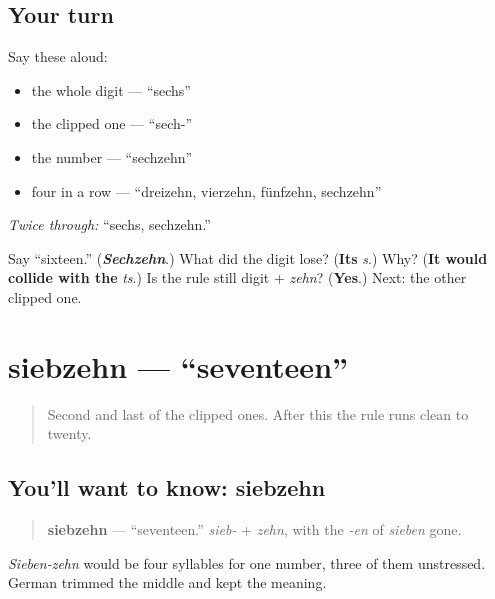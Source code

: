 \subsection*{Your turn}
Say these aloud:

\begin{itemize}
\raggedright
  \item the whole digit — \textquotedblleft{}sechs\textquotedblright{}
  \item the clipped one — \textquotedblleft{}sech-\textquotedblright{}
  \item the number — \textquotedblleft{}sechzehn\textquotedblright{}
  \item four in a row — \textquotedblleft{}dreizehn, vierzehn, fünfzehn, sechzehn\textquotedblright{}
\end{itemize}

\emph{Twice through:} \textquotedblleft{}sechs, sechzehn.\textquotedblright{}

\begin{tcolorbox}[breakable,colback=teal!4,colframe=teal!35!black,title={Before you move on}]
Say \textquotedblleft{}sixteen.\textquotedblright{} (\emph{\textbf{Sechzehn}}.) What did the digit lose? (\textbf{Its} \emph{s}.) Why? (\textbf{It would collide with the} \emph{ts}.) Is the rule still digit + \emph{zehn}? (\textbf{Yes}.) Next: the other clipped one.
\end{tcolorbox}
\section[siebzehn]{siebzehn — \textquotedblleft{}seventeen\textquotedblright{}}

\label{lesson:GE-C12-siebzehn}



\begin{quote}
Second and last of the clipped ones. After this the rule runs clean to twenty.
\end{quote}

\subsection*{You'll want to know: siebzehn}
\begin{quote}
\textbf{siebzehn} — \textquotedblleft{}seventeen.\textquotedblright{} \emph{sieb-} + \emph{zehn}, with the \emph{-en} of \emph{sieben} gone.
\end{quote}

\emph{Sieben-zehn} would be four syllables for one number, three of them unstressed. German trimmed the middle and kept the meaning.

